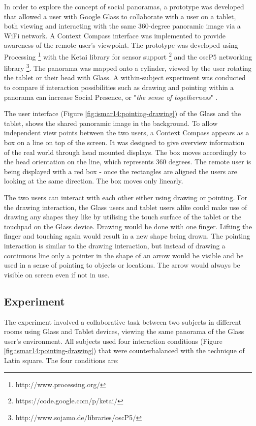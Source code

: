In order to explore the concept of social panoramas, a prototype was developed that allowed a user with Google Glass to collaborate with a user on a tablet, both viewing and interacting with the same 360-degree panoramic image via a WiFi network. A Context Compass interface \cite{Suomela2000}  was implemented to provide awareness of the remote user's viewpoint. The prototype was developed using Processing \footnote{http://www.processing.org/} with the Ketai library for sensor support \footnote{https://code.google.com/p/ketai/} and the oscP5 networking library \footnote{http://www.sojamo.de/libraries/oscP5/}. The panorama was mapped onto a cylinder, viewed by the user rotating the tablet or their head with Glass. A within-subject experiment was conducted to compare if interaction possibilities such as drawing and pointing within a panorama can increase Social Presence, or "\textit{the sense of togetherness}" \cite{Basdogan2001}. 

The user interface (Figure \ref{fig:ismar14:pointing-drawing}) of the Glass and the tablet, shows the shared panoramic image in the background. To allow independent view points between the two users, a Context Compass appears as a box on a line on top of the screen. It was designed to give overview information of the real world through head mounted displays. The box moves accordingly to the head orientation on the line, which represents 360 degrees. The remote user is being displayed with a red box - once the rectangles are aligned the users are looking at the same direction. The box moves only linearly.

The two users can interact with each other either using drawing or pointing. For the drawing interaction, the Glass users and tablet users alike could make use of drawing any shapes they like by utilising the touch surface of the tablet or the touchpad on the Glass device. Drawing would be done with one finger. Lifting the finger and touching again would result in a new shape being drawn. The pointing interaction is similar to the drawing interaction, but instead of drawing a continuous line only a pointer in the shape of an arrow would be visible and be used in a sense of pointing to objects or locations. The arrow would always be visible on screen even if not in use.

\subsection{Experiment}

The experiment involved a collaborative task between two subjects in different rooms using Glass and Tablet devices, viewing the same panorama of the Glass user's environment. All subjects used four interaction conditions (Figure \ref{fig:ismar14:pointing-drawing}) that were counterbalanced with the technique of Latin square. The four conditions are:

